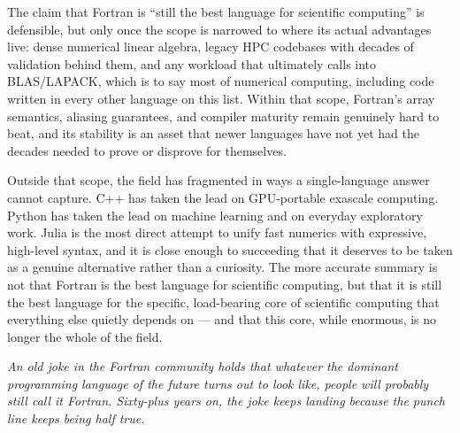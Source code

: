 The claim that Fortran is ``still the best language for scientific computing'' is defensible, but only once the scope is narrowed to where its actual advantages live: dense numerical linear algebra, legacy HPC codebases with decades of validation behind them, and any workload that ultimately calls into BLAS/LAPACK, which is to say most of numerical computing, including code written in every other language on this list. Within that scope, Fortran's array semantics, aliasing guarantees, and compiler maturity remain genuinely hard to beat, and its stability is an asset that newer languages have not yet had the decades needed to prove or disprove for themselves.

Outside that scope, the field has fragmented in ways a single-language answer cannot capture. C++ has taken the lead on GPU-portable exascale computing. Python has taken the lead on machine learning and on everyday exploratory work. Julia is the most direct attempt to unify fast numerics with expressive, high-level syntax, and it is close enough to succeeding that it deserves to be taken as a genuine alternative rather than a curiosity. The more accurate summary is not that Fortran is the best language for scientific computing, but that it is still the best language for the specific, load-bearing core of scientific computing that everything else quietly depends on --- and that this core, while enormous, is no longer the whole of the field.

\bigskip
\noindent\textit{An old joke in the Fortran community holds that whatever the dominant programming language of the future turns out to look like, people will probably still call it Fortran. Sixty-plus years on, the joke keeps landing because the punch line keeps being half true.}

